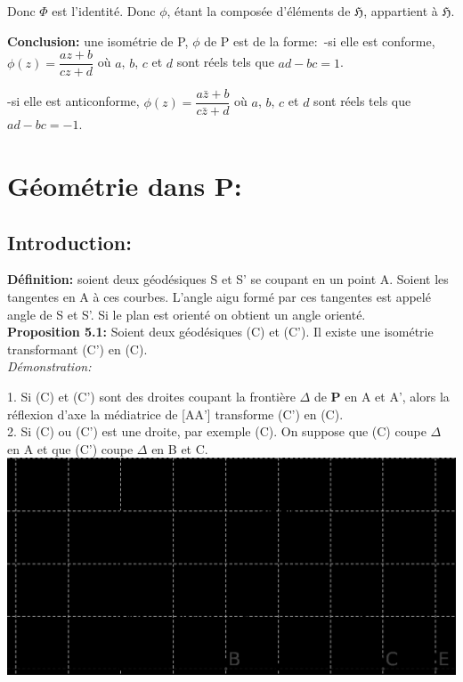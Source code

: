 \documentclass[a4paper, 12pt, twoside]{book}
\begin{document}
  Donc $\Phi$ est l'identité. Donc $\phi$, étant la composée d'éléments de $\mathfrak{H}$, appartient à $\mathfrak{H}$.  
 
 
 \textbf{Conclusion:} une isométrie de P, $\phi$ de P est de la forme:\
 -si elle est conforme, $\phi(z)=\dfrac{az+b}{cz+d}$ où $a$, $b$, $c$ et $d$ sont réels tels que $ad-bc=1$.
 
 -si elle est anticonforme, $\phi(z)=\dfrac{a \bar{z}+b}{c\bar{z}+d}$ où $a$, $b$, $c$ et $d$ sont réels tels que $ad-bc=-1$.


 \chapter{Géométrie dans P:}
 
 
 \section{Introduction:}
 
 \textbf{Définition:} soient deux géodésiques S et S' se coupant en un point A. Soient les tangentes en A à ces courbes. L'angle aigu formé par ces tangentes est appelé angle de S et S'. Si le plan est orienté on obtient un angle orienté.\\
 
 \textbf{Proposition 5.1:} Soient deux géodésiques (C) et (C'). Il existe une isométrie transformant (C') en (C).\\
 
 \textit{Démonstration:}\
 
 1. Si (C) et (C') sont des droites coupant la frontière $\Delta$ de \textbf{P} en A et A', alors la réflexion d'axe la médiatrice de [AA'] transforme (C') en (C).\\
 
 2. Si (C) ou (C') est une droite, par exemple (C). On suppose que (C) coupe $\Delta$ en A et que (C') coupe $\Delta$ en B et C. \\
 
 \includegraphics[scale=0.7]{figures/hyper114.eps} \\
 
\end{document}

